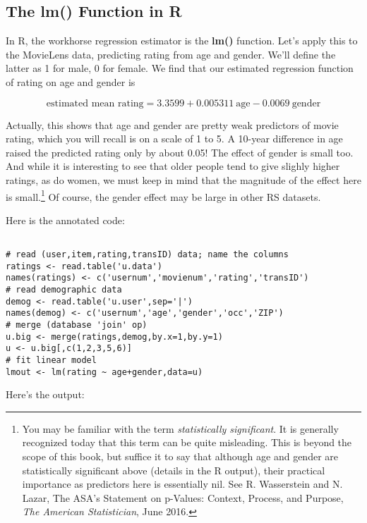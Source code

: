 \subsection{The lm() Function in R}

In R, the workhorse regression estimator is the \textbf{lm()} function.
Let's apply this to the MovieLens data, predicting rating from age and
gender.  We'll define the latter as 1 for male, 0 for female.  We find
that our estimated regression function of rating on age and gender is

\begin{equation}
\textrm{estimated mean rating} = 3.3599 + 0.005311 ~ \textrm{age} 
- 0.0069 ~ \textrm{gender}
\end{equation}

Actually, this shows that age and gender are pretty weak predictors of
movie rating, which you will recall is on a scale of 1 to 5.  A 10-year
difference in age raised the predicted rating only by about 0.05!  The
effect of gender is small too.  And while it is interesting to see that
older people tend to give slighly higher ratings, as do women, we must
keep in mind that the magnitude of the effect here is
small.\footnote{You may be familiar with the term \textit{statistically
significant}.  It is generally recognized today that this term can be
quite misleading.  This is beyond the scope of this book, but suffice it
to say that although age and gender are statistically significant above
(details in the R output), their practical importance as predictors here
is essentially nil.  See R. Wasserstein and N. Lazar, The ASA's
Statement on p-Values: Context, Process, and Purpose, \textit{The
American Statistician}, June 2016.}  Of course, the gender effect may be
large in other RS datasets.

Here is the annotated code:

\begin{lstlisting}

# read (user,item,rating,transID) data; name the columns
ratings <- read.table('u.data') 
names(ratings) <- c('usernum','movienum','rating','transID') 
# read demographic data
demog <- read.table('u.user',sep='|') 
names(demog) <- c('usernum','age','gender','occ','ZIP') 
# merge (database 'join' op)
u.big <- merge(ratings,demog,by.x=1,by.y=1) 
u <- u.big[,c(1,2,3,5,6)] 
# fit linear model
lmout <- lm(rating ~ age+gender,data=u) 

\end{lstlisting}

Here's the output:

